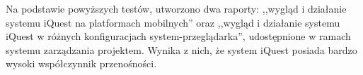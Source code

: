 Na podstawie powyższych testów, utworzono dwa raporty: ,,wygląd i działanie systemu iQuest na platformach mobilnych'' oraz ,,wygląd i działanie systemu iQuest w różnych konfiguracjach system-przeglądarka'', udostępnione w ramach systemu zarządzania projektem\cite{Redmine:ProjDocs}. Wynika z nich, że system iQuest posiada bardzo wysoki współczynnik przenośności.